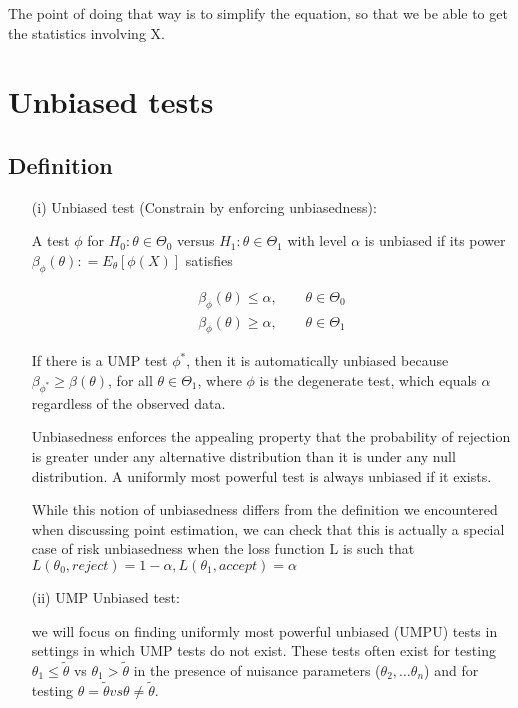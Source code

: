 The point of doing that way is to simplify the equation, so that we be able to get the statistics involving X.


\section{Unbiased tests}

\subsection{Definition}


\begin{itemize}
	\item [(i)] Unbiased test (Constrain by enforcing unbiasedness):
	
A test $\phi$ for $H_0: \theta \in \Theta_0$ versus $H_1: \theta \in \Theta_1$ with level $\alpha$ is unbiased if its power $\beta_{\phi}(\theta): = E_{\theta}[\phi(X)]$ satisfies

\begin{align*}
	\beta_{\phi}(\theta) \leq \alpha, \qquad \theta \in \Theta_0 \\
	\beta_{\phi}(\theta) \geq \alpha, \qquad \theta \in \Theta_1
\end{align*}

If there is a UMP test $\phi^{\ast}$, then it is automatically unbiased because $\beta_{\phi^{\ast}} \geq \beta(\theta)$, for all $\theta \in \Theta_1$, where $\phi$ is the degenerate test, which equals $\alpha$ regardless of the observed data.
	
Unbiasedness enforces the appealing property that the probability of rejection is greater under any alternative distribution than it is under any null distribution. A uniformly most
powerful test is always unbiased if it exists.

While this notion of unbiasedness differs from the definition we encountered when discussing point estimation, we can check that this is actually a special case of risk unbiasedness when
the loss function L is such that $L(\theta_0, reject) = 1- \alpha, L(\theta_1, accept) = \alpha$

	\item[(ii)] UMP Unbiased test:

we will focus on finding uniformly most powerful unbiased (UMPU) tests in settings in which UMP tests do not exist. These tests often exist for testing $\theta_1 \leq \tilde{\theta}$ vs $\theta_1 > \tilde{\theta}$ in the presence of nuisance parameters ($\theta_2, …\theta_n$) and for testing $\theta = \tilde{\theta} vs \theta \neq \tilde{\theta}$.


\end{itemize}
